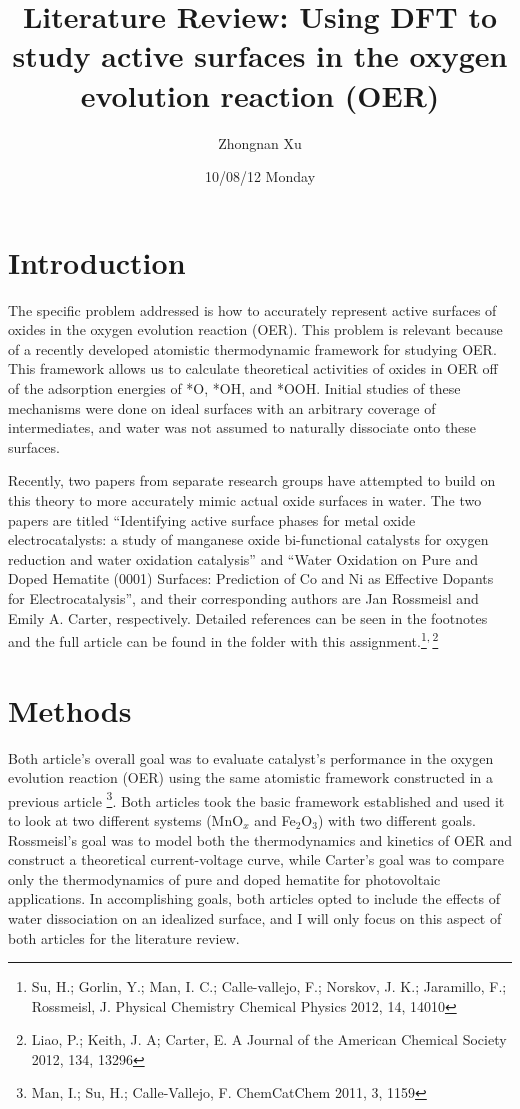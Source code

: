 \documentclass[11pt]{article}
\title{Literature Review: Using DFT to study active surfaces in the oxygen evolution reaction (OER)}
\author{Zhongnan Xu}
\date{10/08/12 Monday}
\begin{document}
\maketitle



\section{Introduction}
\label{sec-1}

  The specific problem addressed is how to accurately represent active
  surfaces of oxides in the oxygen evolution reaction (OER).
  This problem is relevant because of a recently developed atomistic 
  thermodynamic framework for studying OER.
  This framework allows us to calculate theoretical activities of oxides in 
  OER off of the adsorption energies of *O, *OH, and *OOH. 
  Initial studies of these mechanisms were done on ideal surfaces with
  an arbitrary coverage of intermediates, and water was not assumed to
  naturally dissociate onto these surfaces.
  
  Recently, two papers from separate research groups have attempted to
  build on this theory to more accurately mimic actual oxide surfaces
  in water.
  The two papers are titled ``Identifying active surface phases for metal oxide
  electrocatalysts: a study of manganese oxide bi-functional catalysts
  for oxygen reduction and water oxidation catalysis'' and ``Water
  Oxidation on Pure and Doped Hematite (0001) Surfaces: Prediction of Co
  and Ni as Effective Dopants for Electrocatalysis'', and their
  corresponding authors are Jan Rossmeisl and Emily A. Carter,
  respectively.
  Detailed references can be seen in the footnotes and the full article
  can be found in the folder with this assignment.\footnote{Su, H.; Gorlin, Y.; Man, I. C.; Calle-vallejo, F.; Norskov, J. K.;
Jaramillo, F.; Rossmeisl, J. Physical Chemistry Chemical Physics 2012,
14, 14010
 }\textsuperscript{,}\,\footnote{Liao, P.; Keith, J. A; Carter, E. A Journal of the American Chemical
Society 2012, 134, 13296
 }
  
\section{Methods}
\label{sec-2}

  Both article's overall goal was to evaluate catalyst's performance in
  the oxygen evolution reaction (OER) using the same atomistic framework
  constructed in a previous article \footnote{Man, I.; Su, H.; Calle-Vallejo, F. ChemCatChem 2011, 3, 1159
 }.
  Both articles took the basic framework established and used it to
  look at two different systems (MnO$_{x}$ and Fe$_{2}$O$_{3}$) with two
  different goals.
  Rossmeisl's goal was to model both the thermodynamics and
  kinetics of OER and construct a theoretical current-voltage curve,
  while Carter's goal was to compare only the thermodynamics of pure and
  doped hematite for photovoltaic applications.
  In accomplishing goals, both articles opted to include the effects
  of water dissociation on an idealized surface, and I will only focus
  on this aspect of both articles for the literature review. 
\end{document}
